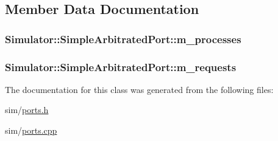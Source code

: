 \subsection{Member Data Documentation}
\hypertarget{class_simulator_1_1_simple_arbitrated_port_a4f5b3c1a0db69be09a10d5a4b77410be}{
\subsubsection[{m\+\_\+processes}]{ Simulator\+::\+Simple\+Arbitrated\+Port\+::m\+\_\+processes\hspace{0.3cm}{\ttfamily [protected]}}}\label{class_simulator_1_1_simple_arbitrated_port_a4f5b3c1a0db69be09a10d5a4b77410be}
\hypertarget{class_simulator_1_1_simple_arbitrated_port_a7183fea61fa2419b2e2edbddbc9f50d0}{
\subsubsection[{m\+\_\+requests}]{ Simulator\+::\+Simple\+Arbitrated\+Port\+::m\+\_\+requests\hspace{0.3cm}{\ttfamily [protected]}}}\label{class_simulator_1_1_simple_arbitrated_port_a7183fea61fa2419b2e2edbddbc9f50d0}


The documentation for this class was generated from the following files\+:\begin{DoxyCompactItemize}
\item 
sim/\hyperlink{ports_8h}{ports.\+h}\item 
sim/\hyperlink{ports_8cpp}{ports.\+cpp}\end{DoxyCompactItemize}

